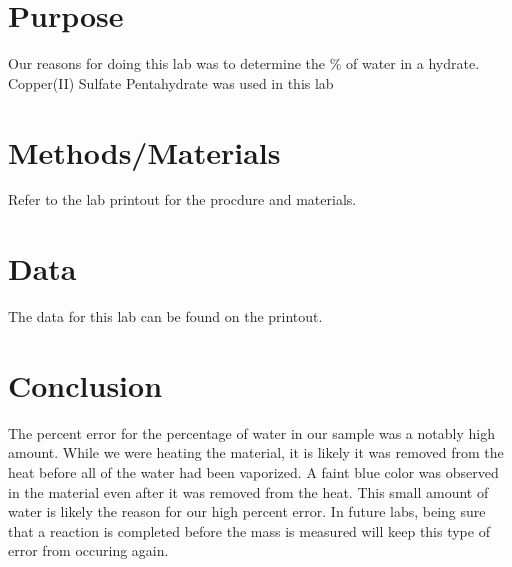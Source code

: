 \documentclass{article}
\begin{document}

\section{Purpose}

Our reasons for doing this lab was to determine the \% of water in a hydrate. Copper(II) Sulfate Pentahydrate was used in this lab

\section{Methods/Materials}

Refer to the lab printout for the procdure and materials.

\section{Data}

The data for this lab can be found on the printout.

\section{Conclusion}

The percent error for the percentage of water in our sample was a notably high amount. While we were heating the material, it is likely it was removed from the heat before all of the water had been vaporized. A faint blue color was observed in the material even after it was removed from the heat. This small amount of water is likely the reason for our high percent error. In future labs, being sure that a reaction is completed before the mass is measured will keep this type of error from occuring again.
\end{document}
